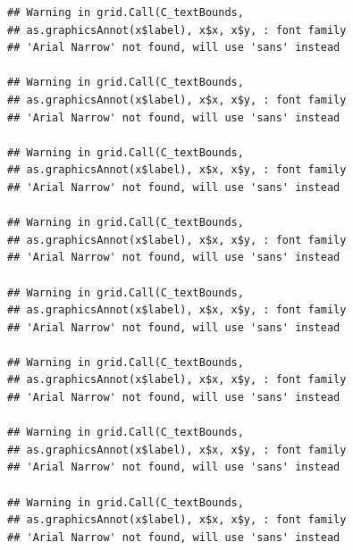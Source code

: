 \documentclass[]{krantz}
\begin{document}
\begin{verbatim}
## Warning in grid.Call(C_textBounds,
## as.graphicsAnnot(x$label), x$x, x$y, : font family
## 'Arial Narrow' not found, will use 'sans' instead

## Warning in grid.Call(C_textBounds,
## as.graphicsAnnot(x$label), x$x, x$y, : font family
## 'Arial Narrow' not found, will use 'sans' instead

## Warning in grid.Call(C_textBounds,
## as.graphicsAnnot(x$label), x$x, x$y, : font family
## 'Arial Narrow' not found, will use 'sans' instead

## Warning in grid.Call(C_textBounds,
## as.graphicsAnnot(x$label), x$x, x$y, : font family
## 'Arial Narrow' not found, will use 'sans' instead

## Warning in grid.Call(C_textBounds,
## as.graphicsAnnot(x$label), x$x, x$y, : font family
## 'Arial Narrow' not found, will use 'sans' instead

## Warning in grid.Call(C_textBounds,
## as.graphicsAnnot(x$label), x$x, x$y, : font family
## 'Arial Narrow' not found, will use 'sans' instead

## Warning in grid.Call(C_textBounds,
## as.graphicsAnnot(x$label), x$x, x$y, : font family
## 'Arial Narrow' not found, will use 'sans' instead

## Warning in grid.Call(C_textBounds,
## as.graphicsAnnot(x$label), x$x, x$y, : font family
## 'Arial Narrow' not found, will use 'sans' instead
\end{verbatim}
\end{document}
